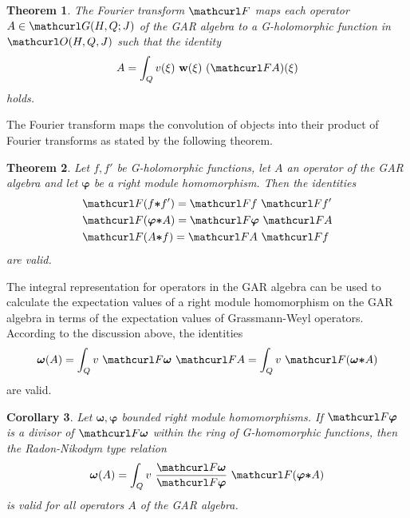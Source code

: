 \documentclass[pra,twoside,amsmath,amsfonts,amssymb,superscriptaddress,showpacs]{revtex4}
\newtheorem{thm}{Theorem}
\newtheorem{cor}[thm]{Corollary}
\def\1#1{{\bf #1}}
\def\9#1{{\mathcurl #1}}
\def\bS#1{{\boldsymbol #1}}
\newcommand{\GAR}[3]{\9G(#1,#3;#2)}
\newcommand{\RHOL}[3]{\9O(#1,#3,#2)}
\newcommand{\FOUR}{{\9F}}
\newcommand{\CON}{{\bS\ast}}
\begin{document}
\begin{thm}
\label{thm:integral-rep}
The Fourier transform $\FOUR$ maps each operator $A\in\GAR{H}{J}{Q}$ of the GAR
algebra to a G-holomorphic function in $\RHOL{H}{J}{Q}$ such that the identity
\begin{equation}
\label{eq:pre-decomp}
A =\int_Q v(\xi) \  {\1w}(\xi) \ (\FOUR A)(\xi)
\end{equation}
holds.
\end{thm}

The Fourier transform maps the convolution of objects into their product of
Fourier transforms as stated by the following theorem. 

\begin{thm}
\label{thm:convol-four}
Let $f,f'$ be G-holomorphic functions, let $A$ an operator of the GAR algebra and let
$\bS\varphi$ be a right module homomorphism. Then the identities 
\begin{equation}
\label{eq:conv-four}
\begin{split}
&\FOUR(f\CON f')=\FOUR f \ \FOUR  f'
\\
&\FOUR(\bS\varphi\CON A)=\FOUR\bS\varphi \  \FOUR A
\\
&\FOUR(A\CON f)=\FOUR A  \ \FOUR f
\end{split}
\end{equation}
are valid.
\end{thm}

The integral representation for operators in the GAR algebra can be used to calculate the
expectation values of a right module homomorphism on the GAR algebra in terms of the expectation
values of Grassmann-Weyl operators. According to the discussion
above,
the identities 
\begin{equation}
{\bS\omega}(A)=\int_Q v \ \FOUR\bS\omega \ \FOUR A =
\int_Q v \ \FOUR (\bS\omega\CON A)
\end{equation}
are valid.

\begin{cor}
\label{cor:RN}
Let $\bS\omega,\bS\varphi$ bounded right module homomorphisms. If 
$\FOUR\bS\varphi$ is a divisor of $\FOUR\bS\omega$ within the ring of G-homomorphic functions, then
the Radon-Nikodym type relation
\begin{equation}
{\bS\omega}(A)=\int_Q v \ \frac{\FOUR\bS\omega}{\FOUR\bS\varphi} \ \FOUR(\bS\varphi\CON A)
\end{equation}
is valid for all operators $A$ of the GAR algebra.
\end{cor}
\end{document}
